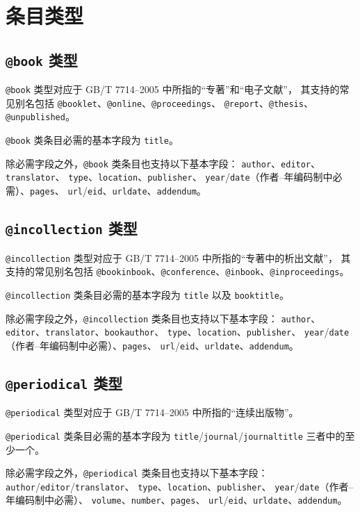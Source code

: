 \documentclass[UTF8]{ctexart}
\begin{document}
\section{条目类型}\label{sec:entries}
\subsection{\texttt{@book} 类型}

\verb|@book| 类型对应于 GB/T 7714--2005 中所指的“专著”和“电子文献”，
其支持的常见别名包括 \verb|@booklet|、\verb|@online|、\verb|@proceedings|、%
\verb|@report|、\verb|@thesis|、\verb|@unpublished|。

\verb|@book| 类条目必需的基本字段为 \verb|title|。

除必需字段之外，\verb|@book| 类条目也支持以下基本字段：%
\verb|author|、\verb|editor|、\verb|translator|、%
\verb|type|、\verb|location|、\verb|publisher|、%
\verb|year|/\verb|date|（作者--年编码制中必需）、\verb|pages|、%
\verb|url|/\verb|eid|、\verb|urldate|、\verb|addendum|。

\subsection{\texttt{@incollection} 类型}

\verb|@incollection| 类型对应于 GB/T 7714--2005 中所指的“专著中的析出文献”，
其支持的常见别名包括
\verb|@bookinbook|、\verb|@conference|、\verb|@inbook|、\verb|@inproceedings|。

\verb|@incollection| 类条目必需的基本字段为 \verb|title| 以及 \verb|booktitle|。

除必需字段之外，\verb|@incollection| 类条目也支持以下基本字段：%
\verb|author|、\verb|editor|、\verb|translator|、\verb|bookauthor|、%
\verb|type|、\verb|location|、\verb|publisher|、%
\verb|year|/\verb|date|（作者--年编码制中必需）、\verb|pages|、%
\verb|url|/\verb|eid|、\verb|urldate|、\verb|addendum|。

\subsection{\texttt{@periodical} 类型}

\verb|@periodical| 类型对应于 GB/T 7714--2005 中所指的“连续出版物”。

\verb|@periodical| 类条目必需的基本字段为
\verb|title|/\verb|journal|/\verb|journaltitle| 三者中的至少一个。

除必需字段之外，\verb|@periodical| 类条目也支持以下基本字段：%
\verb|author|/\verb|editor|/\verb|translator|、%
\verb|type|、\verb|location|、\verb|publisher|、%
\verb|year|/\verb|date|（作者--年编码制中必需）、%
\verb|volume|、\verb|number|、\verb|pages|、%
\verb|url|/\verb|eid|、\verb|urldate|、\verb|addendum|。
\end{document}
